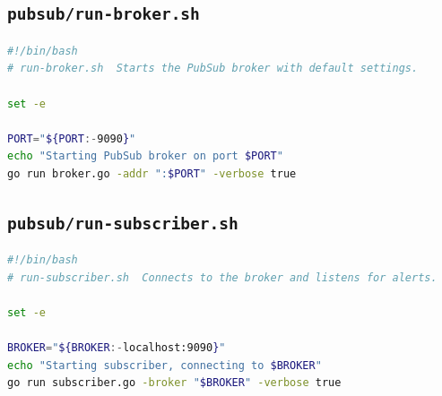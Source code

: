\documentclass[a4paper]{article}
\begin{document}
\subsection{\texttt{pubsub/run-broker.sh}}
\begin{lstlisting}[language=bash, caption=pubsub/run-broker.sh]
#!/bin/bash
# run-broker.sh  Starts the PubSub broker with default settings.

set -e

PORT="${PORT:-9090}"
echo "Starting PubSub broker on port $PORT"
go run broker.go -addr ":$PORT" -verbose true
\end{lstlisting}

\subsection{\texttt{pubsub/run-subscriber.sh}}
\begin{lstlisting}[language=bash, caption=pubsub/run-subscriber.sh]
#!/bin/bash
# run-subscriber.sh  Connects to the broker and listens for alerts.

set -e

BROKER="${BROKER:-localhost:9090}"
echo "Starting subscriber, connecting to $BROKER"
go run subscriber.go -broker "$BROKER" -verbose true
\end{lstlisting}
\end{document}
